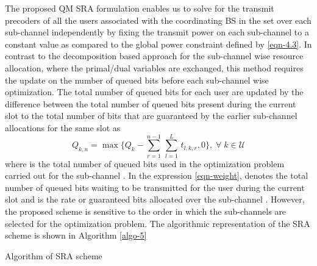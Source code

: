 The proposed \acl{QM} \ac{SRA} formulation enables us to solve for the transmit precoders of all the users associated with the coordinating \ac{BS} in the set  over each sub-channel independently by fixing the transmit power on each sub-channel to a constant value  as compared to the global power constraint defined by \eqref{eqn-4.3}. In contrast to the decomposition based approach for the sub-channel wise resource allocation, where the primal/dual variables are exchanged, this method requires the update on the number of queued bits before each sub-channel wise optimization. The total number of queued bits for each user are updated by the difference between the total number of queued bits present during the current slot to the total number of bits that are guaranteed by the earlier sub-channel allocations for the same slot as
\begin{equation}
Q_{k,n} = \max{\Big \lbrace Q_k - \sum_{r = 1}^{n-1} \, \sum_{l = 1}^{L} \, t_{l,k,r} ,0 \Big \rbrace }, \; \forall \; k \in \mathcal{U}
\label{eqn-weight}
\end{equation}
where  is the total number of queued bits used in the optimization problem carried out for the sub-channel . In the expression \eqref{eqn-weight},  denotes the total number of queued bits waiting to be transmitted for the user  during the current slot and  is the rate or guaranteed bits allocated over the sub-channel . However, the proposed scheme is sensitive to the order in which the sub-channels are selected for the optimization problem. The algorithmic representation of the \ac{SRA} scheme is shown in Algorithm \ref{algo-5}
\begin{algorithm}
 \SetAlgoLined
 \DontPrintSemicolon
 \BlankLine
 \caption{Algorithm of \acs{SRA} scheme}
 \label{algo-5}
\end{algorithm}

